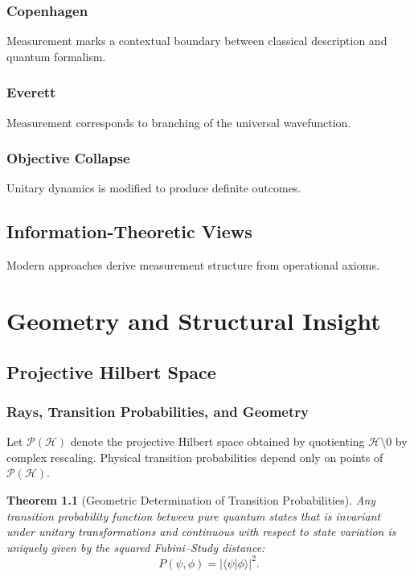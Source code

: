 \documentclass[12pt]{book}
\theoremstyle{plain}
\newtheorem{theorem}{Theorem}[chapter]
\theoremstyle{definition}
\theoremstyle{remark}
\begin{document}
\section{Copenhagen}
Measurement marks a contextual boundary between classical description and quantum formalism.

\section{Everett}
Measurement corresponds to branching of the universal wavefunction.

\section{Objective Collapse}
Unitary dynamics is modified to produce definite outcomes.

\chapter{Information-Theoretic Views}
Modern approaches derive measurement structure from operational axioms.

\part{Geometry and Structural Insight}

\chapter{Projective Hilbert Space}

\section{Rays, Transition Probabilities, and Geometry}

Let $\mathcal{P}(\mathcal{H})$ denote the projective Hilbert space obtained by quotienting $\mathcal{H} \setminus {0}$ by complex rescaling. Physical transition probabilities depend only on points of $\mathcal{P}(\mathcal{H})$.

\begin{theorem}[Geometric Determination of Transition Probabilities]
Any transition probability function between pure quantum states that is invariant under unitary transformations and continuous with respect to state variation is uniquely given by the squared Fubini--Study distance:
\[
P(\psi,\phi) = |\langle \psi | \phi \rangle|^2.
\]
\end{theorem}
\end{document}
